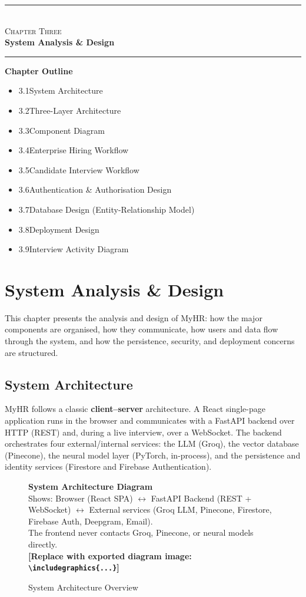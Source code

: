 \documentclass[12pt,a4paper,oneside]{report}
\newcommand{\diagramplaceholder}[1]{%
  \begin{tcolorbox}[
    colback=gray!5, colframe=gray!50,
    boxrule=0.4pt, arc=2pt,
    left=10pt, right=10pt, top=8pt, bottom=8pt,
    fontupper=\small\itshape
  ]
  \centering #1\\[4pt]
  \textbf{[Replace with exported diagram image: \texttt{\textbackslash includegraphics\{...\}}]}
  \end{tcolorbox}%
}
\newcommand{\chapterfrontpage}[3]{%
  \clearpage
  \thispagestyle{empty}
  \vspace*{4cm}
  \begin{center}
    \textcolor{ainshams}{\rule{0.6\linewidth}{1.5pt}}\\[0.6cm]
    {\LARGE\textsc{#1}}\\[0.8cm]
    {\Huge\bfseries #2}\\[0.6cm]
    \textcolor{ainshams}{\rule{0.6\linewidth}{1.5pt}}
  \end{center}
  \vspace{1.8cm}
  \begin{center}
    \begin{minipage}{0.72\linewidth}
      \textbf{\large Chapter Outline}\\[6pt]
      \begin{itemize}[leftmargin=1.4em]
        #3
      \end{itemize}
    \end{minipage}
  \end{center}
  \clearpage
}
\begin{document}
\chapterfrontpage{Chapter Three}{System Analysis \& Design}{%
  \item 3.1\quad System Architecture
  \item 3.2\quad Three-Layer Architecture
  \item 3.3\quad Component Diagram
  \item 3.4\quad Enterprise Hiring Workflow
  \item 3.5\quad Candidate Interview Workflow
  \item 3.6\quad Authentication \& Authorisation Design
  \item 3.7\quad Database Design (Entity-Relationship Model)
  \item 3.8\quad Deployment Design
  \item 3.9\quad Interview Activity Diagram
}

\chapter{System Analysis \& Design}
\label{ch:design}

This chapter presents the analysis and design of MyHR: how the major components are organised,
how they communicate, how users and data flow through the system, and how the persistence,
security, and deployment concerns are structured.

\section{System Architecture}

MyHR follows a classic \textbf{client--server} architecture. A React single-page application
runs in the browser and communicates with a FastAPI backend over HTTP (REST) and, during a live
interview, over a WebSocket. The backend orchestrates four external/internal services: the LLM
(Groq), the vector database (Pinecone), the neural model layer (PyTorch, in-process), and the
persistence and identity services (Firestore and Firebase Authentication).

\begin{figure}[H]
\centering
\diagramplaceholder{%
  \textbf{System Architecture Diagram}\\
  Shows: Browser (React SPA) $\leftrightarrow$ FastAPI Backend (REST + WebSocket) $\leftrightarrow$
  External services (Groq LLM, Pinecone, Firestore, Firebase Auth, Deepgram, Email).\\
  The frontend never contacts Groq, Pinecone, or neural models directly.%
}
\caption{System Architecture Overview}
\label{fig:sysarch}
\end{figure}
\end{document}
